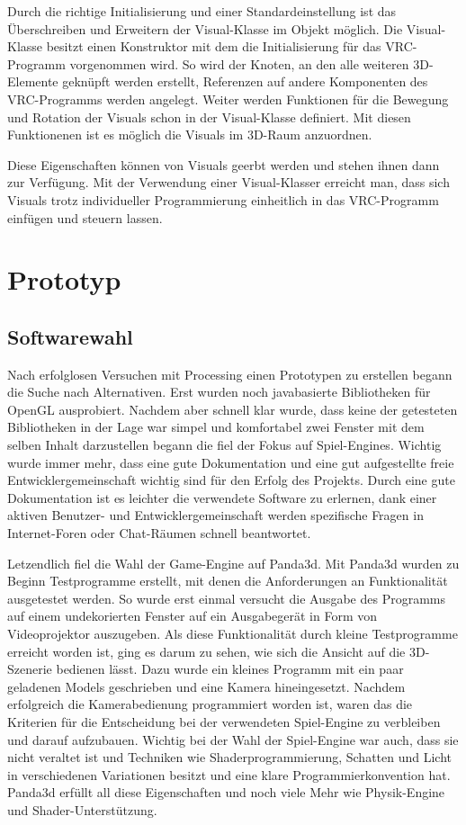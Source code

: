 Durch die richtige Initialisierung und einer Standardeinstellung ist das \"Uberschreiben und Erweitern der Visual-Klasse im
Objekt m\"oglich.
Die Visual-Klasse besitzt einen Konstruktor mit dem die Initialisierung f\"ur das VRC-Programm vorgenommen wird. So wird
der Knoten, an den alle weiteren 3D-Elemente gekn\"upft werden erstellt, Referenzen auf andere Komponenten des
VRC-Programms werden angelegt.
Weiter werden Funktionen f\"ur die Bewegung und Rotation der Visuals schon in der Visual-Klasse definiert. Mit diesen
Funktionenen ist es m\"oglich die Visuals im 3D-Raum anzuordnen.

Diese Eigenschaften k\"onnen von Visuals geerbt werden und stehen ihnen dann zur Verf\"ugung. Mit der Verwendung einer
Visual-Klasser erreicht man, dass sich Visuals trotz individueller Programmierung einheitlich in das VRC-Programm
einf\"ugen und steuern lassen.

\section{Prototyp}

\subsection{Softwarewahl}

Nach erfolglosen Versuchen mit Processing einen Prototypen zu erstellen begann die Suche nach Alternativen. Erst
wurden noch javabasierte Bibliotheken f\"ur OpenGL ausprobiert. Nachdem aber schnell klar wurde, dass keine der
getesteten Bibliotheken in der Lage war simpel und komfortabel zwei Fenster mit dem selben Inhalt darzustellen begann
die fiel der Fokus auf Spiel-Engines. Wichtig wurde immer mehr, dass eine gute Dokumentation und eine gut aufgestellte
freie Entwicklergemeinschaft wichtig sind f\"ur den Erfolg des Projekts. Durch eine gute Dokumentation ist es
leichter die verwendete Software zu erlernen, dank einer aktiven Benutzer- und Entwicklergemeinschaft werden spezifische
Fragen in Internet-Foren oder Chat-R\"aumen schnell beantwortet.

Letzendlich fiel die Wahl der Game-Engine auf Panda3d. Mit Panda3d wurden zu Beginn Testprogramme erstellt, mit denen
die Anforderungen an Funktionalit\"at ausgetestet werden. So wurde erst einmal versucht die Ausgabe des Programms
auf einem undekorierten Fenster auf ein Ausgabeger\"at in Form von Videoprojektor auszugeben. Als diese Funktionalit\"at
durch kleine Testprogramme erreicht worden ist, ging es darum zu sehen, wie sich die Ansicht auf die 3D-Szenerie
bedienen l\"asst. Dazu wurde ein kleines Programm mit ein paar geladenen Models geschrieben und eine Kamera hineingesetzt.
Nachdem erfolgreich die Kamerabedienung programmiert worden ist, waren das die Kriterien f\"ur die Entscheidung bei der
verwendeten Spiel-Engine zu verbleiben und darauf aufzubauen. Wichtig bei der Wahl der Spiel-Engine war auch, dass
sie nicht veraltet ist und Techniken wie Shaderprogrammierung, Schatten und Licht in verschiedenen Variationen besitzt und
eine klare Programmierkonvention hat. Panda3d erf\"ullt all diese Eigenschaften und noch viele Mehr wie Physik-Engine und
Shader-Unterst\"utzung.

